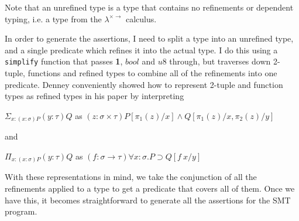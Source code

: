 Note that an unrefined type is a type that contains no refinements or dependent typing, i.e. a type
from the $\lambda^{\times \rightarrow}$ calculus.

In order to generate the assertions, I need to split a type into an unrefined type, and a single
predicate which refines it into the actual type.
I do this using a \texttt{simplify} function that passes \textbf{1}, $bool$ and $u8$ through,
but traverses down 2-tuple, functions and refined types to combine all of the refinements into one
predicate.
Denney conveniently showed how to represent 2-tuple and function types as refined types in his paper
by interpreting

\begin{center}
    $\Sigma_{x:(x:\sigma)P} (y:\tau)Q$
    \quad as \quad
    $(z: \sigma \times \tau)P[\pi_1(z)/x] \land Q[\pi_1(z)/x, \pi_2(z)/y]$

    and

    $\Pi_{x:(x:\sigma)P} (y:\tau)Q$
    \quad as \quad
    $(f: \sigma \rightarrow \tau) \forall x : \sigma . P \supset Q[f\ x / y]$
\end{center}

With these representations in mind, we take the conjunction of all the refinements applied to a type
to get a predicate that covers all of them.
Once we have this, it becomes straightforward to generate all the assertions for the SMT program.

